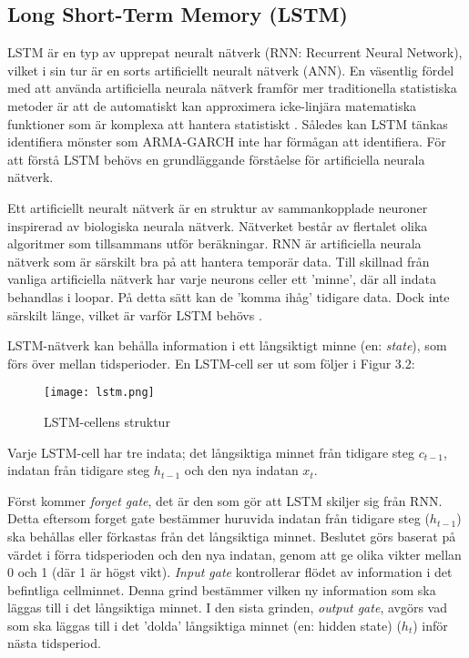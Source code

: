 \documentclass[11pt]{article}
\numberwithin{equation}{section}
\numberwithin{table}{section}
\numberwithin{figure}{section}
\begin{document}
\subsection{Long Short-Term Memory (LSTM)}
LSTM är en typ av upprepat neuralt nätverk (RNN: Recurrent Neural Network), vilket i sin tur är en sorts artificiellt neuralt nätverk (ANN). En väsentlig fördel med att använda artificiella neurala nätverk framför mer traditionella statistiska metoder är att de automatiskt kan approximera icke-linjära matematiska funktioner som är komplexa att hantera statistiskt \parencite{paliwal2009neural}. Således kan LSTM tänkas identifiera mönster som ARMA-GARCH inte har förmågan att identifiera.  För att förstå LSTM behövs en grundläggande förståelse för artificiella neurala nätverk. 

Ett artificiellt neuralt nätverk är en struktur av sammankopplade neuroner inspirerad av biologiska neurala nätverk. Nätverket består av flertalet olika algoritmer som tillsammans utför beräkningar. RNN är artificiella neurala nätverk som är särskilt bra på att hantera temporär data. Till skillnad från vanliga artificiella nätverk har varje neurons celler ett 'minne', där all indata behandlas i loopar. På detta sätt kan de 'komma ihåg' tidigare data. Dock inte särskilt länge, vilket är varför LSTM behövs \parencite[][,s.478-559]{purkait2019hands}. 

LSTM-nätverk kan behålla information i ett långsiktigt minne (en: \textit{state}), som förs över mellan tidsperioder. En LSTM-cell ser ut som följer i Figur 3.2:
\begin{figure}[H]
\caption{LSTM-cellens struktur \parencite[lånad från][]{yuan2019nonlinear}}
\texttt{[image: lstm.png]}
\centering
\end{figure}

Varje LSTM-cell har tre indata; det långsiktiga minnet från tidigare steg \(c_{t-1}\), indatan från tidigare steg \(h_{t-1}\) och den nya indatan \(x_{t}\).

Först kommer \textit{forget gate}, det är den som gör att LSTM skiljer sig från RNN. Detta eftersom forget gate bestämmer huruvida indatan från tidigare steg (\(h_{t-1}\)) ska behållas eller förkastas från det långsiktiga minnet. Beslutet görs baserat på värdet i förra tidsperioden och den nya indatan, genom att ge olika vikter mellan 0 och 1 (där 1 är högst vikt). \textit{Input gate} kontrollerar flödet av information i det befintliga cellminnet. Denna grind bestämmer vilken ny information som ska läggas till i det långsiktiga minnet. I den sista grinden, \textit{output gate}, avgörs vad som ska läggas till i det 'dolda' långsiktiga minnet (en: hidden state) (\(h_{t}\)) inför nästa tidsperiod.
\end{document}
